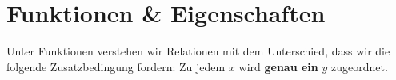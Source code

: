 \section{Funktionen \& Eigenschaften}

Unter Funktionen verstehen wir Relationen mit dem Unterschied, dass wir die folgende Zusatzbedingung fordern: Zu jedem \( x \) wird \textbf{genau ein} \( y \) zugeordnet.










